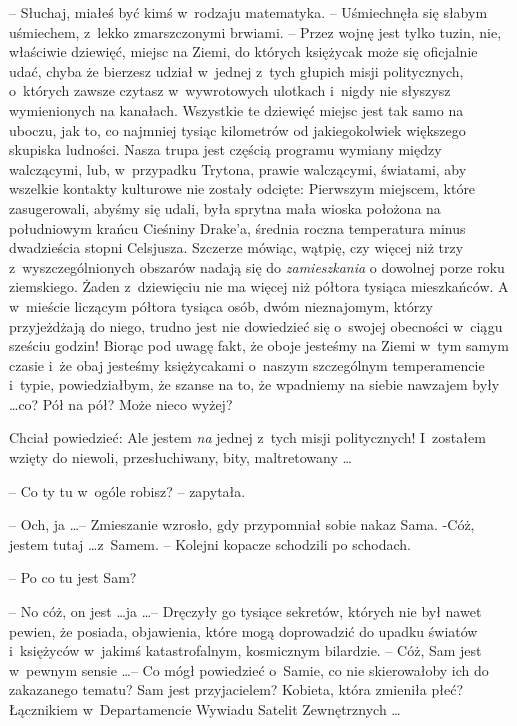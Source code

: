 \documentclass[oneside,polish,11pt,rmheadings]{mwbk}
\begin{document}
-- Słuchaj, miałeś być kimś w~rodzaju matematyka. -- Uśmiechnęła się słabym uśmiechem, z~lekko zmarszczonymi brwiami. -- Przez wojnę jest tylko tuzin, nie, właściwie dziewięć, miejsc na Ziemi, do których księżycak może się oficjalnie udać, chyba że bierzesz udział w~jednej z~tych głupich misji politycznych, o~których zawsze czytasz w~wywrotowych ulotkach i~nigdy nie słyszysz wymienionych na kanałach. Wszystkie te dziewięć miejsc jest tak samo na uboczu, jak to, co najmniej tysiąc kilometrów od jakiegokolwiek większego skupiska ludności. Nasza trupa jest częścią programu wymiany między walczącymi, lub, w~przypadku Trytona, prawie walczącymi, światami, aby wszelkie kontakty kulturowe nie zostały odcięte: Pierwszym miejscem, które zasugerowali, abyśmy się udali, była sprytna mała wioska położona na południowym krańcu Cieśniny Drake'a,  średnia roczna temperatura minus dwadzieścia stopni Celsjusza. Szczerze mówiąc, wątpię, czy więcej niż trzy z~wyszczególnionych obszarów nadają się do \textit{zamieszkania }o dowolnej porze roku ziemskiego. Żaden z~dziewięciu nie ma więcej niż półtora tysiąca mieszkańców. A w~mieście liczącym półtora tysiąca osób, dwóm nieznajomym, którzy przyjeżdżają do niego, trudno jest nie dowiedzieć się o~swojej obecności w~ciągu sześciu godzin! Biorąc pod uwagę fakt, że oboje jesteśmy na Ziemi w~tym samym czasie i~że obaj jesteśmy księżycakami o~naszym szczególnym temperamencie i~typie, powiedziałbym, że szanse na to, że wpadniemy na siebie nawzajem były \ldots  co? Pół na pół? Może nieco wyżej?

Chciał powiedzieć: Ale jestem \textit{na }jednej z~tych misji politycznych! I~zostałem wzięty do niewoli, przesłuchiwany, bity, maltretowany \ldots  

-- Co ty tu w~ogóle robisz? -- zapytała. 

-- Och, ja \ldots  -- Zmieszanie wzrosło, gdy przypomniał sobie nakaz Sama. -Cóż, jestem tutaj \ldots  z~Samem. -- Kolejni kopacze schodzili po schodach. 

-- Po co tu jest Sam? 

-- No cóż, on jest \ldots   ja \ldots  -- Dręczyły go tysiące sekretów, których nie był nawet pewien, że posiada, objawienia, które mogą doprowadzić do upadku światów i~księżyców w~jakimś katastrofalnym, kosmicznym bilardzie. 
-- Cóż, Sam jest w~pewnym sensie \ldots -- Co mógł powiedzieć o~Samie, co nie skierowałoby ich do zakazanego tematu? Sam jest przyjacielem? Kobieta, która zmieniła płeć? Łącznikiem w~Departamencie Wywiadu Satelit Zewnętrznych \ldots  
\end{document}
